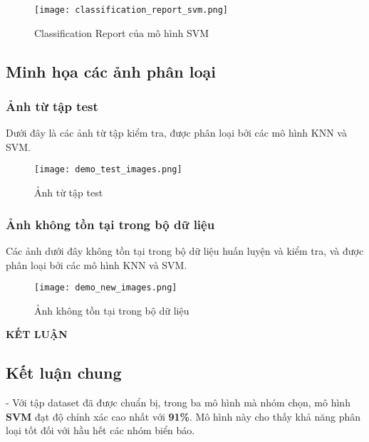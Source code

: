 \documentclass[a4paper,12pt]{article}
\begin{document}
\begin{figure}[H]
    \centering
    \texttt{[image: classification\_report\_svm.png]}
    \caption{Classification Report của mô hình SVM}
    \label{fig:svm_classification_report}
\end{figure}

\newpage
\subsection{Minh họa các ảnh phân loại}

\subsubsection{Ảnh từ tập test}

Dưới đây là các ảnh từ tập kiểm tra, được phân loại bởi các mô hình KNN và SVM.

\begin{figure}[H]
    \centering
    \texttt{[image: demo\_test\_images.png]}
    \caption{Ảnh từ tập test}
    \label{fig:test_images}
\end{figure}

\subsubsection{Ảnh không tồn tại trong bộ dữ liệu}

Các ảnh dưới đây không tồn tại trong bộ dữ liệu huấn luyện và kiểm tra, và được phân loại bởi các mô hình KNN và SVM.

\begin{figure}[H]
    \centering
    \texttt{[image: demo\_new\_images.png]}
    \caption{Ảnh không tồn tại trong bộ dữ liệu}
    \label{fig:new_images}
\end{figure}

\newpage
{}
\thispagestyle{empty}
\begin{center}
    \textbf{\large KẾT LUẬN}
\end{center}
\vspace{1cm}
\subsection*{Kết luận chung}

\hspace{6mm}- Với tập dataset đã được chuẩn bị, trong ba mô hình mà nhóm chọn, mô hình \textbf{SVM} đạt độ chính xác cao nhất với \textbf{91\%}. Mô hình này cho thấy khả năng phân loại tốt đối với hầu hết các nhóm biển báo. 
\end{document}
